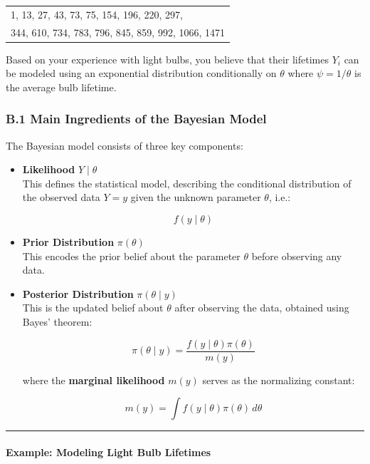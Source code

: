 \documentclass[
]{article}
\begin{document}
\begin{table}[!h]
\centering
\begin{tabular}{l}
1, 13, 27, 43, 73, 75, 154, 196, 220, 297,\\
344, 610, 734, 783, 796, 845, 859, 992, 1066, 1471
\end{tabular}
\end{table}

Based on your experience with light bulbs, you believe that their
lifetimes \(Y_i\) can be modeled using an exponential distribution
conditionally on \(\theta\) where \(\psi = 1/\theta\) is the average
bulb lifetime.

\subsubsection{B.1 Main Ingredients of the Bayesian
Model}\label{b.1-main-ingredients-of-the-bayesian-model}

The Bayesian model consists of three key components:

\begin{itemize}
\item
  \textbf{Likelihood} \(Y \mid \theta\)\\
  This defines the statistical model, describing the conditional
  distribution of the observed data \(Y = y\) given the unknown
  parameter \(\theta\), i.e.:

  \[
  f(y \mid \theta)
  \]
\item
  \textbf{Prior Distribution} \(\pi(\theta)\)\\
  This encodes the prior belief about the parameter \(\theta\) before
  observing any data.
\item
  \textbf{Posterior Distribution} \(\pi(\theta \mid y)\)\\
  This is the updated belief about \(\theta\) after observing the data,
  obtained using Bayes' theorem:

  \[
  \pi(\theta \mid y) = \frac{f(y \mid \theta)\pi(\theta)}{m(y)}
  \]

  where the \textbf{marginal likelihood} \(m(y)\) serves as the
  normalizing constant:

  \[
  m(y) = \int f(y \mid \theta)\pi(\theta)\,d\theta
  \]
\end{itemize}

\begin{center}\rule{0.5\linewidth}{0.5pt}\end{center}

\paragraph{Example: Modeling Light Bulb
Lifetimes}\label{example-modeling-light-bulb-lifetimes}
\end{document}

